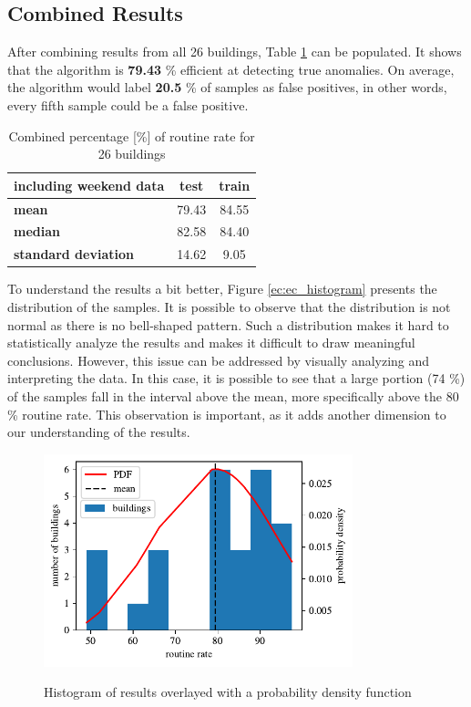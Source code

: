 \subsection{Combined Results}

After combining results from all 26 buildings, Table \ref{tab:ec_res_weekend} can be populated.
It shows that the algorithm is \textbf{79.43} \% efficient at detecting true anomalies. 
On average, the algorithm would label \textbf{20.5} \% of samples as false positives, 
in other words, every fifth sample could be a false positive. 

\begin{table}[htbp]
    \centering
    \caption{Combined percentage [\%] of routine rate for 26 buildings}
    \label{tab:ec_res_weekend}
    \begin{tabular}{lcc}
        \hline
        \textbf{including weekend data} & \textbf{test} & \textbf{train} \\
        \hline
        \textbf{mean} & 79.43 & 84.55 \\
        \textbf{median} & 82.58 & 84.40 \\
        \textbf{standard deviation} & 14.62 & 9.05 \\
        \hline
        \end{tabular}
\end{table}

To understand the results a bit better, Figure \ref{ec:ec_histogram} presents the distribution of the samples.
It is possible to observe that the distribution is not normal as there is no bell-shaped pattern.
Such a distribution makes it hard to statistically analyze the results and makes it difficult to draw meaningful conclusions.
However, this issue can be addressed by visually analyzing and interpreting the data.
In this case, it is possible to see that a large portion (74 \%) of the samples fall in the interval above the mean, more specifically above the 80 \% routine rate.
This observation is important, as it adds another dimension to our understanding of the results.


\begin{figure}[H]
    \centering
    \caption{Histogram of results overlayed with a probability density function}
    \includegraphics[width=0.8\textwidth]{Figures/EC/ec_histogram.pdf}
    \label{fig:ec_histogram}
\end{figure}

